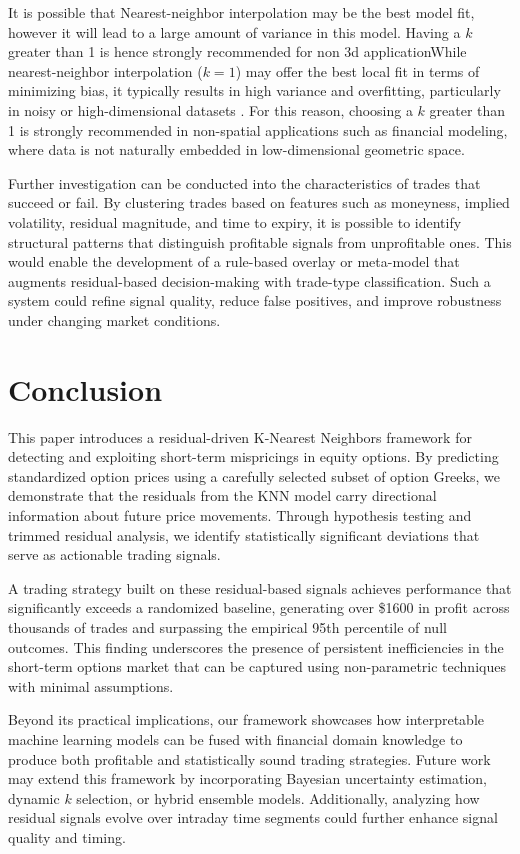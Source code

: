 \documentclass{article}
\begin{document}
It is possible that Nearest-neighbor interpolation may be the best model fit, however it will lead to a large amount of variance in this model. Having a $k$ greater than 1 is hence strongly recommended for non 3d applicationWhile nearest-neighbor interpolation (\( k = 1 \)) may offer the best local fit in terms of minimizing bias, it typically results in high variance and overfitting, particularly in noisy or high-dimensional datasets \citep{caruana2006empirical}. For this reason, choosing a $k$ greater than 1 is strongly recommended in non-spatial applications such as financial modeling, where data is not naturally embedded in low-dimensional geometric space.

Further investigation can be conducted into the characteristics of trades that succeed or fail. By clustering trades based on features such as moneyness, implied volatility, residual magnitude, and time to expiry, it is possible to identify structural patterns that distinguish profitable signals from unprofitable ones. This would enable the development of a rule-based overlay or meta-model that augments residual-based decision-making with trade-type classification. Such a system could refine signal quality, reduce false positives, and improve robustness under changing market conditions.
 
\section{Conclusion}

This paper introduces a residual-driven K-Nearest Neighbors framework for detecting and exploiting short-term mispricings in equity options. By predicting standardized option prices using a carefully selected subset of option Greeks, we demonstrate that the residuals from the KNN model carry directional information about future price movements. Through hypothesis testing and trimmed residual analysis, we identify statistically significant deviations that serve as actionable trading signals.

A trading strategy built on these residual-based signals achieves performance that significantly exceeds a randomized baseline, generating over \$1600 in profit across thousands of trades and surpassing the empirical 95th percentile of null outcomes. This finding underscores the presence of persistent inefficiencies in the short-term options market that can be captured using non-parametric techniques with minimal assumptions.

Beyond its practical implications, our framework showcases how interpretable machine learning models can be fused with financial domain knowledge to produce both profitable and statistically sound trading strategies. Future work may extend this framework by incorporating Bayesian uncertainty estimation, dynamic $k$ selection, or hybrid ensemble models. Additionally, analyzing how residual signals evolve over intraday time segments could further enhance signal quality and timing.
\end{document}
